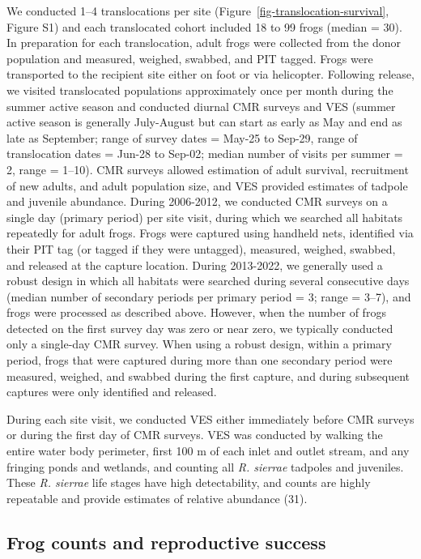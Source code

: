 \documentclass[9pt,twocolumn,twoside,lineno]{pnas-new}
\begin{document}
{We conducted 1--4 translocations per site
(Figure~\ref{fig-translocation-survival}, Figure S1)
and each translocated cohort included 18 to 99 frogs (median = 30). In
preparation for each translocation, adult frogs were collected from the
donor population and measured, weighed, swabbed, and PIT tagged. Frogs
were transported to the recipient site either on foot or via helicopter.
Following release, we visited translocated populations approximately
once per month during the summer active season and conducted diurnal CMR
surveys and VES (summer active season is generally July-August but can
start as early as May and end as late as September; range of survey
dates = May-25 to Sep-29, range of translocation dates = Jun-28 to
Sep-02; median number of visits per summer = 2, range = 1--10). CMR
surveys allowed estimation of adult survival, recruitment of new adults,
and adult population size, and VES provided estimates of tadpole and
juvenile abundance. During 2006-2012, we conducted CMR surveys on a
single day (primary period) per site visit, during which we searched all
habitats repeatedly for adult frogs. Frogs were captured using handheld
nets, identified via their PIT tag (or tagged if they were untagged),
measured, weighed, swabbed, and released at the capture location. During
2013-2022, we generally used a robust design in which all habitats were
searched during several consecutive days (median number of secondary
periods per primary period = 3; range = 3--7), and frogs were processed
as described above. However, when the number of frogs detected on the
first survey day was zero or near zero, we typically conducted only a
single-day CMR survey. When using a robust design, within a primary
period, frogs that were captured during more than one secondary period
were measured, weighed, and swabbed during the first capture, and during
subsequent captures were only identified and released.

During each site visit, we conducted VES either immediately before CMR
surveys or during the first day of CMR surveys. VES was conducted by
walking the entire water body perimeter, first 100 m of each inlet and
outlet stream, and any fringing ponds and wetlands, and counting all
\emph{R. sierrae} tadpoles and juveniles. These \emph{R. sierrae} life
stages have high detectability, and counts are highly repeatable and
provide estimates of relative abundance (31).

\hypertarget{frog-counts-and-reproductive-success}{%
\subsection*{Frog counts and reproductive
success}\label{frog-counts-and-reproductive-success}}

}
\end{document}
